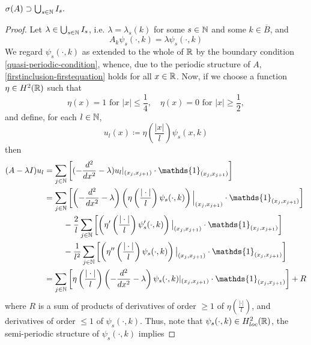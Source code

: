 \begin{theorem} \label{4.1:thm-MainResult.FirstInclusion}
	$\sigma(A) \supset \bigcup_{s \in \mathbb{N}} I_{s}.$
	
	\begin{proof}
		Let $\lambda \in \bigcup_{s \in \mathbb{N}} I_{s}$, i.e. $\lambda = \lambda_{s}(k)$ for some $s \in \mathbb{N}$ and some $k \in \overline{B}$, and 
		\begin{equation} %
			A_{k} \psi_{s}(\cdot, k) = \lambda \psi_{s}(\cdot, k) \label{firstinclusion-firstequation} %
		\end{equation}
		We regard $\psi_{s}(\cdot, k)$ as extended to the whole of $\mathbb{R}$ by the boundary condition \eqref{quasi-periodic-condition}, whence, due to the periodic structure of $A$, \eqref{firstinclusion-firstequation} holds for all $x \in \mathbb{R}$. Now, if we choose a function $\eta \in H^{2}(\mathbb{R})$ such that
			\[ \eta(x) = 1 \text{ for } |x| \leq \frac{1}{4}, \quad \eta(x) = 0 \text{ for } |x| \geq \frac{1}{2}, \]
		and define, for each $l \in \mathbb{N}$,
			\[ u_{l}(x) \coloneqq \eta\left(\frac{|x|}{l}\right) \psi_{s}(x, k) \]
	 	then
		\begin{align}
			(A - \lambda I) u_{l} & = \sum_{j \in \N} \left[ (- \frac{d^{2}}{dx^{2}} - \lambda) u_{l}|_{(x_{j}, x_{j+1})} \cdot \mathds{1}_{(x_{j}, x_{j+1})} \right] \label{eq:sepofspectraleq} \\
				& = \sum_{j \in \N} \left[ \left(- \frac{d^{2}}{dx^{2}} - \lambda \right) \left( \eta\left(\frac{|\cdot|}{l}\right) \psi_{s}(\cdot, k) \right)\Big|_{(x_{j}, x_{j+1})} \cdot \mathds{1}_{(x_{j}, x_{j+1})} \right] \notag \\
				& ~\qquad - \frac{2}{l} \sum_{j \in \N} \left[ \left( \eta'\left(\frac{|\cdot|}{l}\right) \psi_{s}'(\cdot, k) \right)\big|_{(x_{j}, x_{j+1})} \cdot \mathds{1}_{(x_{j}, x_{j+1})}  \right] \notag \\
				& ~\qquad - \frac{1}{l^{2}} \sum_{j \in \N} \left[ \left( \eta''\left(\frac{|\cdot|}{l}\right) \psi_{s}(\cdot, k) \right)\big|_{(x_{j}, x_{j+1})} \cdot \mathds{1}_{(x_{j}, x_{j+1})} \right] \notag \\
				& = \sum_{j \in \N} \left[ \eta\left(\frac{|\cdot|}{l}\right) \left(- \frac{d^{2}}{dx^{2}} - \lambda \right) \psi_{s}(\cdot, k) |_{(x_{j}, x_{j+1})} \cdot \mathds{1}_{(x_{j}, x_{j+1})} \right] + R \notag
		\end{align}
		where $R$ is a sum of products of derivatives of order $\geq 1$ of $\eta\left(\frac{|\cdot|}{l}\right)$, and derivatives of order $\leq 1$ of $\psi_{s}(\cdot, k)$. Thus, note that $\psi_{s}(\cdot, k) \in H^{2}_{loc}(\mathbb{R})$, the semi-periodic structure of $\psi_{s}(\cdot, k)$ implies

\end{proof}
\end{theorem}

